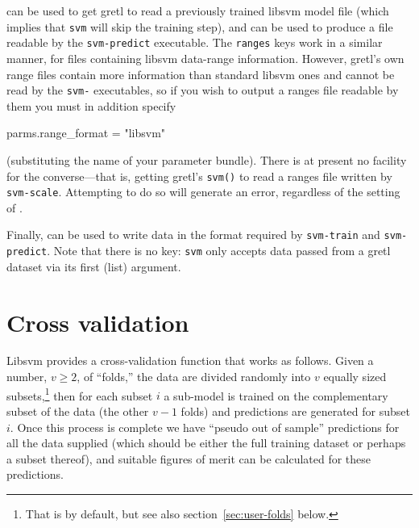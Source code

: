 \documentclass{article}
\begin{document}
 can be used to get gretl to read a previously
trained \textsf{libsvm} model file (which implies that \texttt{svm}
will skip the training step), and  can be used
to produce a file readable by the \texttt{svm-predict} executable.
The \texttt{ranges} keys work in a similar manner, for files
containing \textsf{libsvm} data-range information. However, gretl's
own range files contain more information than standard \textsf{libsvm}
ones and cannot be read by the \texttt{svm-} executables, so if you
wish to output a ranges file readable by them you must in addition
specify
\begin{code}
parms.range_format = "libsvm"
\end{code}
(substituting the name of your parameter bundle). There is at present
no facility for the converse---that is, getting gretl's \texttt{svm()}
to read a ranges file written by \texttt{svm-scale}. Attempting to do
so will generate an error, regardless of the setting of
.

Finally,  can be used to write data in the
format required by \texttt{svm-train} and \texttt{svm-predict}. Note
that there is no  key: \texttt{svm} only accepts
data passed from a gretl dataset via its first (list) argument.

\section{Cross validation}
\label{sec:xvalid}

\textsf{Libsvm} provides a cross-validation function that works as
follows. Given a number, $v \geq 2$, of ``folds,'' the data are
divided randomly into $v$ equally sized subsets,\footnote{That is by
  default, but see also section~\ref{sec:user-folds} below.} then
for each subset $i$ a sub-model is trained on the complementary subset
of the data (the other $v-1$ folds) and predictions are generated for
subset $i$. Once this process is complete we have ``pseudo out of
sample'' predictions for all the data supplied (which should be either
the full training dataset or perhaps a subset thereof), and suitable
figures of merit can be calculated for these predictions.
\end{document}

